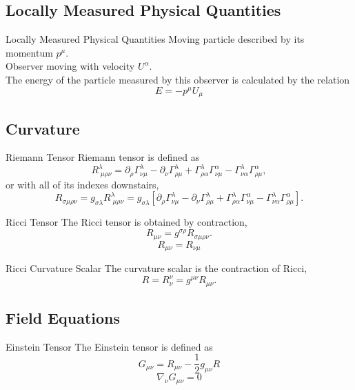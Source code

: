 \documentclass{beamer}
\begin{document}
\begin{darkframes}
	\subsection{Locally Measured Physical Quantities}
    	\begin{frame}{Locally Measured Physical Quantities}
        	Moving particle described by its momentum $p^\mu$.\\
            \medskip
            \pause
            Observer moving with velocity $U^\alpha$.\\
            \pause
            \bigskip
            The energy of the particle measured by this observer is calculated by the relation
            $$ E = - p^\mu U_\mu $$    	
    	\end{frame}
	
    \subsection{Curvature}  
    \begin{frame}{Riemann Tensor}
    	Riemann tensor is defined as
		$$
		R_{\;\mu\rho\nu}^{\lambda}=\partial_{\rho}\Gamma_{\nu\mu}^{\lambda}-			\partial_{\nu}\Gamma_{\rho\mu}^{\lambda}+\Gamma_{\rho\alpha}^{\lambda}\Gamma_{\nu\mu}^{\alpha}-\Gamma_{\nu\alpha}^{\lambda}\Gamma_{\rho\mu}^{\alpha},
		$$
        \pause
		or with all of its indexes downstairs, 
		$$
 R_{\sigma\mu\rho\nu}=g_{\sigma\lambda}R_{\;\mu\rho\nu}^{\lambda}=g_{\sigma\lambda}\left[\partial_{\rho}\Gamma_{\nu\mu}^{\lambda}-\partial_{\nu}\Gamma_{\rho\mu}^{\lambda}+\Gamma_{\rho\alpha}^{\lambda}\Gamma_{\nu\mu}^{\alpha}-\Gamma_{\nu\alpha}^{\lambda}\Gamma_{\rho\mu}^{\alpha}\right].
		$$
    \end{frame}

	\begin{frame}{Ricci Tensor}
    	The Ricci tensor is obtained by contraction, 
		$$
		R_{\mu\nu}=g^{\sigma\rho}R_{\sigma\mu\rho\nu}.
		$$
    	\pause
    	$$ R_{\mu\nu} = R_{\nu\mu}$$
    \end{frame}
    
    \begin{frame}{Ricci Curvature Scalar}
    	The curvature scalar is the contraction of Ricci,
		$$ R = R_{\nu}^{\nu} = g^{\mu\nu}R_{\mu\nu}. $$
    \end{frame}
    
    \subsection{Field Equations}
    \begin{frame}{Einstein Tensor}
    	The Einstein tensor is defined as
		$$ G_{\mu\nu} = R_{\mu\nu} - \frac{1}{2}g_{\mu\nu}R $$
        \pause
        $$ \nabla_\nu G_{\mu\nu} = 0 $$
    \end{frame}
    

\end{darkframes}
\end{document}
